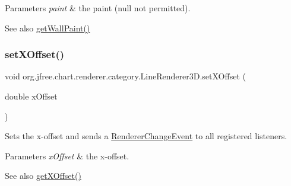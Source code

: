 \begin{DoxyParams}{Parameters}
{\em paint} & the paint ({\ttfamily null} not permitted).\\
\hline
\end{DoxyParams}
\begin{DoxySeeAlso}{See also}
\mbox{\hyperlink{classorg_1_1jfree_1_1chart_1_1renderer_1_1category_1_1_line_renderer3_d_a3e748bdcb67c8caf5ff6ffec78b88f10}{get\+Wall\+Paint()}} 
\end{DoxySeeAlso}
\mbox{\label{classorg_1_1jfree_1_1chart_1_1renderer_1_1category_1_1_line_renderer3_d_ada06deb5c7f08ef5f6cb476cd8a08341}} 
\subsubsection{\texorpdfstring{set\+X\+Offset()}{setXOffset()}}
{\footnotesize\ttfamily void org.\+jfree.\+chart.\+renderer.\+category.\+Line\+Renderer3\+D.\+set\+X\+Offset (\begin{DoxyParamCaption}\item[{double}]{x\+Offset }\end{DoxyParamCaption})}

Sets the x-\/offset and sends a \mbox{\hyperlink{}{Renderer\+Change\+Event}} to all registered listeners.


\begin{DoxyParams}{Parameters}
{\em x\+Offset} & the x-\/offset.\\
\hline
\end{DoxyParams}
\begin{DoxySeeAlso}{See also}
\mbox{\hyperlink{classorg_1_1jfree_1_1chart_1_1renderer_1_1category_1_1_line_renderer3_d_ad4ec91cbd2dd6ec17a01be964f076ad1}{get\+X\+Offset()}} 
\end{DoxySeeAlso}
\mbox{\label{classorg_1_1jfree_1_1chart_1_1renderer_1_1category_1_1_line_renderer3_d_a3f07b5e6292162fcbdf70da3f9d9e2a0}} 
